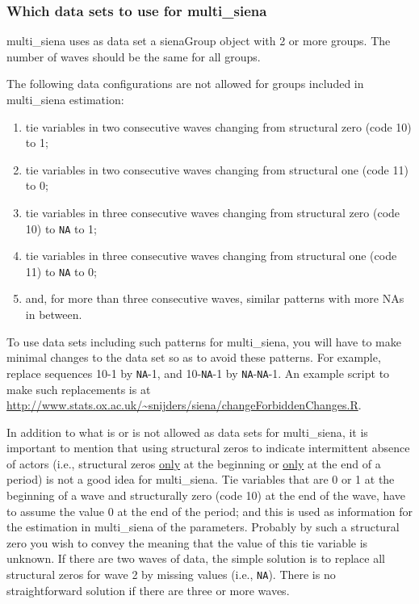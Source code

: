 \documentclass[a4paper,fleqn,11pt]{article}
\newcommand{\+}{\, + \,}
\newcommand{\sfn}[1]{\textsf{#1}}
\begin{document}
\subsubsection{Which data sets to use for multi\_siena}
\label{S_sBData}

\textsf{multi\_siena} uses as data set a \sfn{sienaGroup} object with 2 or more groups.
The number of waves should be the same for all groups.

The following data configurations are not allowed for groups
included in \textsf{multi\_siena} estimation:
\begin{enumerate}
\item tie variables in two consecutive waves changing from
    structural zero (code 10) to 1;
\item tie variables in two consecutive waves changing from
    structural one (code 11) to 0;
\item tie variables in three consecutive waves changing from
    structural zero (code 10) to \texttt{NA} to 1;
\item tie variables in three consecutive waves changing from
    structural one (code 11) to \texttt{NA} to 0;
\item and, for more than three consecutive waves, similar patterns
    with more NAs in between.
\end{enumerate}
To use data sets including such patterns for \textsf{multi\_siena},
you will have to make minimal changes to the data set
so as to avoid these patterns.
For example, replace sequences 10-1 by \texttt{NA}-1,
and 10-\texttt{NA}-1 by \texttt{NA}-\texttt{NA}-1.
An example script to make such replacements is at
{\small{\url{http://www.stats.ox.ac.uk/~snijders/siena/changeForbiddenChanges.R}}}.

In addition to what is or is not allowed as data sets for \textsf{multi\_siena},
it is important to mention that using structural zeros to indicate
intermittent absence of actors (i.e., structural zeros \underline{only} at the beginning
or  \underline{only} at the end of a period) is not a good idea
for \textsf{multi\_siena}.
Tie variables that are 0 or 1 at the beginning of a wave and
structurally zero (code 10) at the end of the wave, have to assume
the value 0 at the end of the period; and this is used as information
for the estimation in \textsf{multi\_siena} of the parameters.
Probably by such a structural zero you wish to convey the meaning that the value
of this tie variable is unknown.
If there are two waves of data, the simple solution is to replace
all structural zeros for wave 2 by missing values (i.e., \texttt{NA}).
There is no straightforward solution if there are three or more waves.
\medskip
\end{document}
